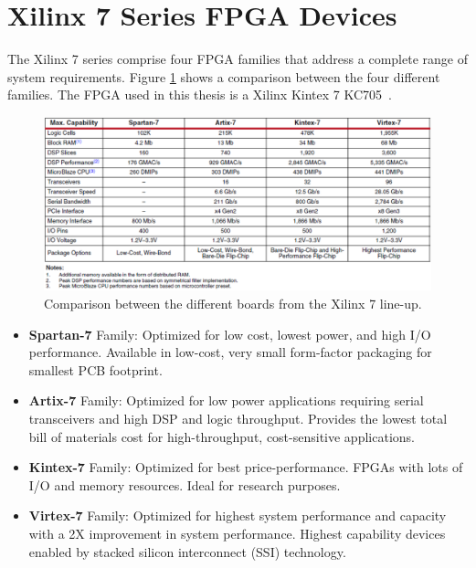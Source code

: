 \section{Xilinx 7 Series FPGA Devices}
\noindent The Xilinx 7 series comprise four FPGA families that address a complete range of system requirements.
Figure \ref{fig:kintex72} shows a comparison between the four different families.
The FPGA used in this thesis is a Xilinx Kintex 7 KC705~\cite{xilinx7}.
\begin{figure}[H]
	\centering
	\includegraphics[width=0.8\linewidth]{IMG/ch3/KINTEX72}
	\caption{Comparison between the different boards from the Xilinx 7 line-up.}
	\label{fig:kintex72}
\end{figure}
\begin{itemize}
	\item  \textbf{Spartan-7} Family: Optimized for low cost, lowest power, and high
	I/O performance. Available in low-cost, very small form-factor
	packaging for smallest PCB footprint.
	\item \textbf{Artix-7} Family: Optimized for low power applications requiring serial
	transceivers and high DSP and logic throughput. Provides the lowest
	total bill of materials cost for high-throughput, cost-sensitive
	applications.
	\item \textbf{Kintex-7} Family: Optimized for best price-performance. FPGAs with lots of I/O and memory resources. Ideal for research purposes.
	\item \textbf{Virtex-7} Family: Optimized for highest system performance and
	capacity with a 2X improvement in system performance. Highest
	capability devices enabled by stacked silicon interconnect (SSI)
	technology.
\end{itemize}
